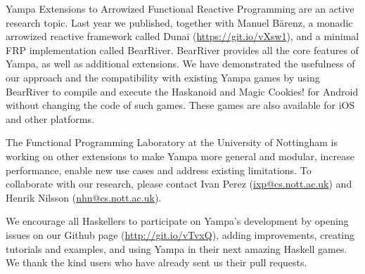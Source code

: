 \begin{hcarentry}[updated]{Yampa}
Extensions to Arrowized Functional Reactive Programming are an active research
topic. Last year we published, together with Manuel B\"arenz, a monadic
arrowized reactive framework called Dunai
(\href{https://git.io/vXsw1}{https://git.io/vXsw1}), and a minimal FRP
implementation called BearRiver. BearRiver provides all the core features of
Yampa, as well as additional extensions. We have demonstrated the usefulness of
our approach and the compatibility with existing Yampa games by using BearRiver
to compile and execute the Haskanoid and Magic Cookies! for Android without
changing the code of such games. These games are also available for iOS and
other platforms.

The Functional Programming Laboratory at the University of Nottingham is
working on other extensions to make Yampa more general and modular, increase
performance, enable new use cases and address existing limitations. To
collaborate with our research, please contact Ivan Perez
(\href{mailto:ixp@cs.nott.ac.uk}{ixp@cs.nott.ac.uk}) and Henrik Nilsson
(\href{mailto:nhn@cs.nott.ac.uk}{nhn@cs.nott.ac.uk}).

We encourage all Haskellers to participate on Yampa's development by opening
issues on our Github page (\href{http://git.io/vTvxQ}{http://git.io/vTvxQ}),
adding improvements, creating tutorials and examples, and using Yampa in their
next amazing Haskell games. We thank the kind users who have already sent us
their pull requests.
\end{hcarentry}
